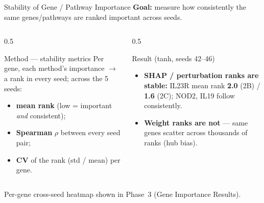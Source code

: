 \documentclass[aspectratio=169]{beamer}
\begin{document}

\begin{frame}{Stability of Gene / Pathway Importance}
    \small
    \textbf{Goal:} measure how consistently the same genes/pathways are ranked important across seeds.

    \begin{columns}[T]
        \begin{column}{0.5\textwidth}
            \begin{block}{Method --- stability metrics}
                \footnotesize
                Per gene, each method's importance $\rightarrow$ a rank in every seed; across the 5 seeds:
                \begin{itemize}
                    \item \textbf{mean rank} (low = important \emph{and} consistent);
                    \item \textbf{Spearman} $\rho$ between every seed pair;
                    \item \textbf{CV} of the rank (std / mean) per gene.
                \end{itemize}
            \end{block}
        \end{column}
        \begin{column}{0.5\textwidth}
            \begin{block}{Result (tanh, seeds 42--46)}
                \footnotesize
                \begin{itemize}
                    \item \textbf{SHAP / perturbation ranks are stable:} IL23R mean rank
                          \textbf{2.0} (2B) / \textbf{1.6} (2C); NOD2, IL19 follow consistently.
                    \item \textbf{Weight ranks are not} — same genes scatter across thousands of ranks
                          (hub bias).
                \end{itemize}
            \end{block}
        \end{column}
    \end{columns}
    \vspace{0.2cm}
    \centering\footnotesize Per-gene cross-seed heatmap shown in Phase~3 (Gene Importance Results).
\end{frame}
\end{document}
